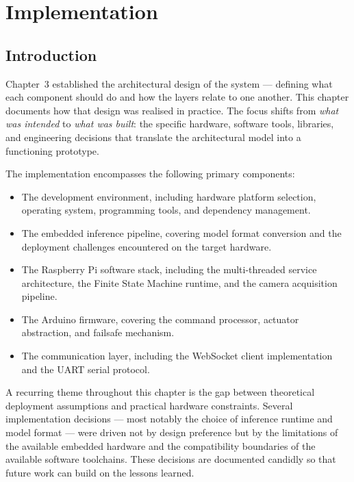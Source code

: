 \chapter{Implementation}
 
\section*{Introduction}
 
Chapter~3 established the architectural design of the system —
defining what each component should do and how the layers relate to
one another. This chapter documents how that design was realised in
practice. The focus shifts from \emph{what was intended} to
\emph{what was built}: the specific hardware, software tools,
libraries, and engineering decisions that translate the architectural
model into a functioning prototype.
 
The implementation encompasses the following primary components:
 
\begin{itemize}
    \item The development environment, including hardware platform
          selection, operating system, programming tools, and
          dependency management.
    \item The embedded inference pipeline, covering model format
          conversion and the deployment challenges encountered on
          the target hardware.
    \item The Raspberry Pi software stack, including the multi-threaded
          service architecture, the Finite State Machine runtime, and
          the camera acquisition pipeline.
    \item The Arduino firmware, covering the command processor,
          actuator abstraction, and failsafe mechanism.
    \item The communication layer, including the WebSocket client
          implementation and the UART serial protocol.
\end{itemize}
 
A recurring theme throughout this chapter is the gap between
theoretical deployment assumptions and practical hardware constraints.
Several implementation decisions — most notably the choice of
inference runtime and model format — were driven not by design
preference but by the limitations of the available embedded hardware
and the compatibility boundaries of the available software toolchains.
These decisions are documented candidly so that future work can build
on the lessons learned.
 
